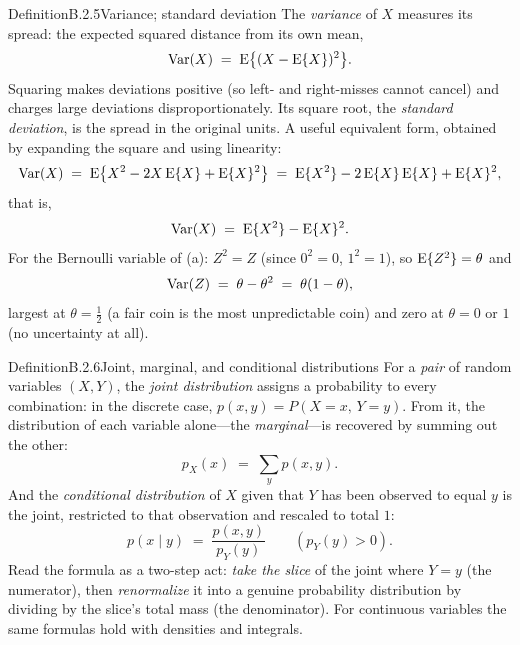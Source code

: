 \documentclass[main.tex]{subfiles}
\begin{document}
\begin{Obj}{Definition}{B.2.5}{Variance; standard deviation}
The \emph{variance} of $X$ measures its spread: the expected squared distance from its own
mean,
\[ \operatorname{Var}(X) \;=\; \mathrm{E}\big\{ (X - \mathrm{E}\{X\})^2 \big\} . \]
Squaring makes deviations positive (so left- and right-misses cannot cancel) and charges
large deviations disproportionately. Its square root, the \emph{standard deviation}, is the
spread in the original units. A useful equivalent form, obtained by expanding the square and
using linearity:
\[ \operatorname{Var}(X) \;=\; \mathrm{E}\big\{X^2 - 2X\,\mathrm{E}\{X\} + \mathrm{E}\{X\}^2\big\}
   \;=\; \mathrm{E}\{X^2\} - 2\,\mathrm{E}\{X\}\,\mathrm{E}\{X\} + \mathrm{E}\{X\}^2 , \]
that is,
\[ \operatorname{Var}(X) \;=\; \mathrm{E}\{X^2\} - \mathrm{E}\{X\}^2 . \]
For the Bernoulli variable of (a): $Z^2=Z$ (since $0^2=0$, $1^2=1$), so
$\mathrm{E}\{Z^2\}=\theta$ and
\[ \operatorname{Var}(Z) \;=\; \theta - \theta^2 \;=\; \theta(1-\theta) , \]
largest at $\theta=\tfrac12$ (a fair coin is the most unpredictable coin) and zero at
$\theta=0$ or $1$ (no uncertainty at all).
\end{Obj}

\begin{Obj}{Definition}{B.2.6}{Joint, marginal, and conditional distributions}
For a \emph{pair} of random variables $(X,Y)$, the \emph{joint distribution} assigns a
probability to every combination: in the discrete case, $p(x,y)=P(X=x,\,Y=y)$. From it, the
distribution of each variable alone---the \emph{marginal}---is recovered by summing out the
other:
\[ p_X(x) \;=\; \sum_y p(x,y) . \]
And the \emph{conditional distribution} of $X$ given that $Y$ has been observed to equal $y$
is the joint, restricted to that observation and rescaled to total $1$:
\[ p(x \mid y) \;=\; \frac{p(x,y)}{p_Y(y)} \qquad (p_Y(y)>0) . \]
Read the formula as a two-step act: \emph{take the slice} of the joint where $Y=y$ (the
numerator), then \emph{renormalize} it into a genuine probability distribution by dividing
by the slice's total mass (the denominator). For continuous variables the same formulas hold
with densities and integrals.
\end{Obj}
\end{document}
